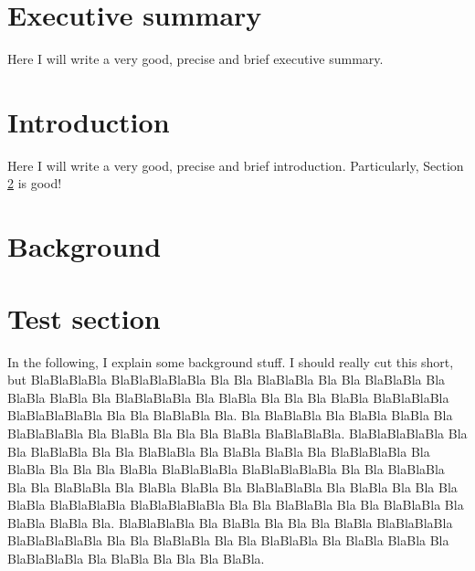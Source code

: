 \documentclass[11pt,twoside]{article}
\numberwithin{Theorem}{section}
\numberwithin{Definition}{section}
\numberwithin{Lemma}{section}
\numberwithin{Algorithm}{section}
\numberwithin{equation}{section}
\begin{document}
\cleardoublepage



\pagestyle{plain}
\setcounter{page}{1}

\cleardoublepage

\setcounter{page}{1}


\clearpage

\section*{Executive summary}
\label{sec.intro}

Here I will write a very good, precise and brief executive summary.
\clearpage

\section{Introduction}
\label{sec.intro}

Here I will write a very good, precise and brief introduction.
Particularly, Section \ref{sec:background} is good!
\clearpage

\section{Background}
\label{sec:background}

\section{Test section}

In the following, I explain some background stuff. I should really cut this short, but BlaBlaBlaBla BlaBlaBlaBlaBla Bla Bla BlaBlaBla Bla Bla BlaBlaBla Bla BlaBla BlaBla Bla BlaBlaBlaBla Bla BlaBla Bla Bla Bla BlaBla BlaBlaBlaBla BlaBlaBlaBlaBla Bla Bla BlaBlaBla Bla. Bla BlaBlaBla Bla BlaBla BlaBla Bla BlaBlaBlaBla Bla BlaBla Bla Bla Bla BlaBla BlaBlaBlaBla. BlaBlaBlaBlaBla Bla Bla BlaBlaBla Bla Bla BlaBlaBla Bla BlaBla BlaBla Bla BlaBlaBlaBla Bla BlaBla Bla Bla Bla BlaBla BlaBlaBlaBla BlaBlaBlaBlaBla Bla Bla BlaBlaBla Bla Bla BlaBlaBla Bla BlaBla BlaBla Bla BlaBlaBlaBla Bla BlaBla Bla Bla Bla BlaBla BlaBlaBlaBla BlaBlaBlaBlaBla Bla Bla BlaBlaBla Bla Bla BlaBlaBla Bla BlaBla BlaBla Bla. BlaBlaBlaBla Bla BlaBla Bla Bla Bla BlaBla BlaBlaBlaBla BlaBlaBlaBlaBla Bla Bla BlaBlaBla Bla Bla BlaBlaBla Bla BlaBla BlaBla Bla BlaBlaBlaBla Bla BlaBla Bla Bla Bla BlaBla.
\end{document}
